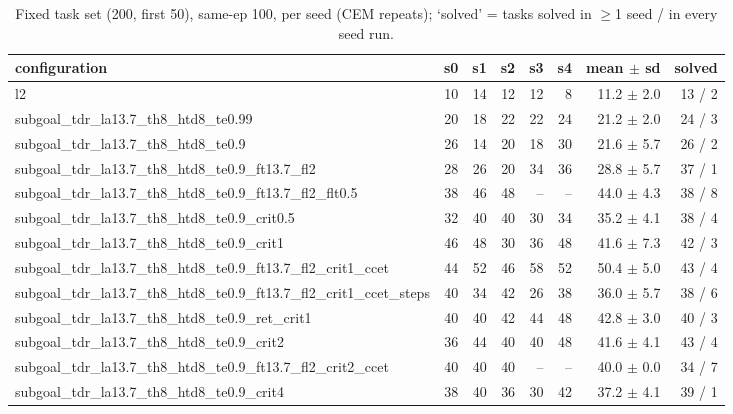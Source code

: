 \begin{table}[H]
\centering\small
\caption{Fixed task set (200, first 50), same-ep 100, per seed (CEM repeats); `solved' = tasks solved in $\ge$1 seed / in every seed run.}
\label{tab:gas-mpc-pooled-same100-task200-n50}
\begin{tabular}{lrrrrrrr}
\toprule
configuration & s0 & s1 & s2 & s3 & s4 & mean $\pm$ sd & solved \\
\midrule
l2 & 10 & 14 & 12 & 12 & 8 & 11.2 $\pm$ 2.0 & 13 / 2 \\
subgoal\_tdr\_la13.7\_th8\_htd8\_te0.99 & 20 & 18 & 22 & 22 & 24 & 21.2 $\pm$ 2.0 & 24 / 3 \\
subgoal\_tdr\_la13.7\_th8\_htd8\_te0.9 & 26 & 14 & 20 & 18 & 30 & 21.6 $\pm$ 5.7 & 26 / 2 \\
subgoal\_tdr\_la13.7\_th8\_htd8\_te0.9\_ft13.7\_fl2 & 28 & 26 & 20 & 34 & 36 & 28.8 $\pm$ 5.7 & 37 / 1 \\
subgoal\_tdr\_la13.7\_th8\_htd8\_te0.9\_ft13.7\_fl2\_flt0.5 & 38 & 46 & 48 & -- & -- & 44.0 $\pm$ 4.3 & 38 / 8 \\
subgoal\_tdr\_la13.7\_th8\_htd8\_te0.9\_crit0.5 & 32 & 40 & 40 & 30 & 34 & 35.2 $\pm$ 4.1 & 38 / 4 \\
subgoal\_tdr\_la13.7\_th8\_htd8\_te0.9\_crit1 & 46 & 48 & 30 & 36 & 48 & 41.6 $\pm$ 7.3 & 42 / 3 \\
subgoal\_tdr\_la13.7\_th8\_htd8\_te0.9\_ft13.7\_fl2\_crit1\_ccet & 44 & 52 & 46 & 58 & 52 & 50.4 $\pm$ 5.0 & 43 / 4 \\
subgoal\_tdr\_la13.7\_th8\_htd8\_te0.9\_ft13.7\_fl2\_crit1\_ccet\_steps & 40 & 34 & 42 & 26 & 38 & 36.0 $\pm$ 5.7 & 38 / 6 \\
subgoal\_tdr\_la13.7\_th8\_htd8\_te0.9\_ret\_crit1 & 40 & 40 & 42 & 44 & 48 & 42.8 $\pm$ 3.0 & 40 / 3 \\
subgoal\_tdr\_la13.7\_th8\_htd8\_te0.9\_crit2 & 36 & 44 & 40 & 40 & 48 & 41.6 $\pm$ 4.1 & 43 / 4 \\
subgoal\_tdr\_la13.7\_th8\_htd8\_te0.9\_ft13.7\_fl2\_crit2\_ccet & 40 & 40 & 40 & -- & -- & 40.0 $\pm$ 0.0 & 34 / 7 \\
subgoal\_tdr\_la13.7\_th8\_htd8\_te0.9\_crit4 & 38 & 40 & 36 & 30 & 42 & 37.2 $\pm$ 4.1 & 39 / 1 \\
\bottomrule
\end{tabular}
\end{table}

